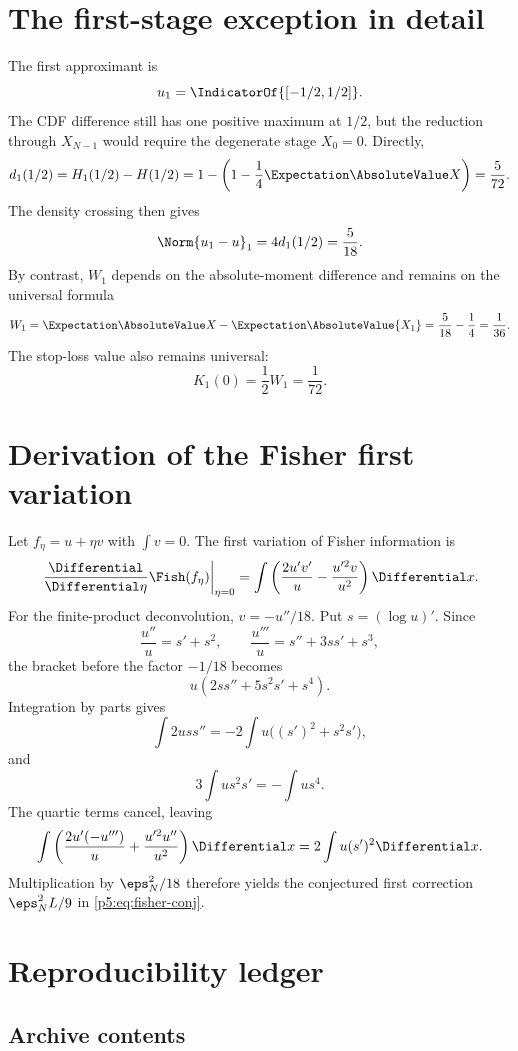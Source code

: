 \documentclass[11pt,oneside]{article}
\numberwithin{equation}{section}
\theoremstyle{definition}
\theoremstyle{remark}
\begin{document}
\appendix

\section{The first-stage exception in detail}
\label{p5:app:first}

The first approximant is
\[
 u_1=\IndicatorOf{[-1/2,1/2]}.
\]
The CDF difference still has one positive maximum at $1/2$, but the reduction through $X_{N-1}$ would require the degenerate stage $X_0=0$.  Directly,
\[
 d_1(1/2)=H_1(1/2)-H(1/2)
 =1-\left(1-\frac14\Expectation\AbsoluteValue X\right)
 =\frac5{72}.
\]
The density crossing then gives
\[
 \Norm{u_1-u}_1=4d_1(1/2)=\frac5{18}.
\]
By contrast, $W_1$ depends on the absolute-moment difference and remains on the universal formula
\[
 W_1=\Expectation\AbsoluteValue X-\Expectation\AbsoluteValue{X_1}
 =\frac5{18}-\frac14=\frac1{36}.
\]
The stop-loss value also remains universal:
\[
 K_1(0)=\frac12W_1=\frac1{72}.
\]

\section{Derivation of the Fisher first variation}
\label{p5:app:fisher}

Let $f_\eta=u+\eta v$ with $\int v=0$.  The first variation of Fisher information is
\begin{equation}
 \left.\frac{\Differential}{\Differential\eta}\Fish(f_\eta)\right|_{\eta=0}
 =\int\left(\frac{2u'v'}u-\frac{u'^2v}{u^2}\right)\Differential x.
 \label{p5:eq:fisher-variation}
\end{equation}
For the finite-product deconvolution, $v=-u''/18$.  Put $s=(\log u)'$.  Since
\[
 \frac{u''}{u}=s'+s^2,
 \qquad
 \frac{u'''}u=s''+3ss'+s^3,
\]
the bracket before the factor $-1/18$ becomes
\[
 u\left(2ss''+5s^2s'+s^4\right).
\]
Integration by parts gives
\[
 \int2uss''=-2\int u\bigl((s')^2+s^2s'\bigr),
\]
and
\[
 3\int us^2s'=-\int us^4.
\]
The quartic terms cancel, leaving
\[
 \int\left(\frac{2u'(-u''')}{u}+\frac{u'^2u''}{u^2}\right)\Differential x
 =2\int u(s')^2\Differential x.
\]
Multiplication by $\eps_N^2/18$ therefore yields the conjectured first correction $\eps_N^2L/9$ in \eqref{p5:eq:fisher-conj}.

\section{Reproducibility ledger}
\label{p5:app:repro}

\subsection{Archive contents}
\end{document}
